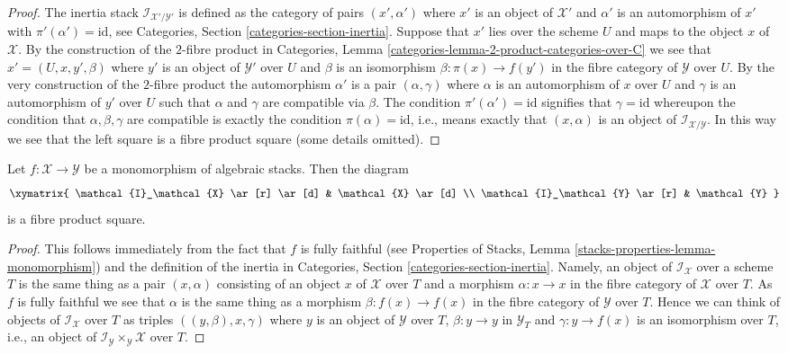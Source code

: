 \begin{proof}
The inertia stack $\mathcal{I}_{\mathcal{X}'/\mathcal{Y}'}$ is defined as the
category of pairs $(x', \alpha')$ where $x'$ is an object of $\mathcal{X}'$
and $\alpha'$ is an automorphism of $x'$ with $\pi'(\alpha') = \text{id}$, see
Categories, Section \ref{categories-section-inertia}.
Suppose that $x'$ lies over the scheme $U$ and maps to the object
$x$ of $\mathcal{X}$. By the construction of the $2$-fibre product in
Categories, Lemma \ref{categories-lemma-2-product-categories-over-C}
we see that $x' = (U, x, y', \beta)$ where $y'$ is an object of $\mathcal{Y}'$
over $U$ and $\beta$ is an isomorphism
$\beta : \pi(x) \to f(y')$ in the fibre category of $\mathcal{Y}$ over $U$.
By the very construction of the $2$-fibre product the automorphism $\alpha'$
is a pair $(\alpha, \gamma)$ where $\alpha$ is an automorphism of $x$ over $U$
and $\gamma$ is an automorphism of $y'$ over $U$ such that
$\alpha$ and $\gamma$ are compatible via $\beta$. The condition
$\pi'(\alpha') = \text{id}$ signifies that $\gamma = \text{id}$
whereupon the condition that $\alpha, \beta, \gamma$ are compatible
is exactly the condition $\pi(\alpha) = \text{id}$, i.e., means
exactly that $(x, \alpha)$ is an object of
$\mathcal{I}_{\mathcal{X}/\mathcal{Y}}$.
In this way we see that the left square is a fibre product square
(some details omitted).
\end{proof}

\begin{lemma}
\label{lemma-monomorphism-cartesian-square-inertia}
Let $f : \mathcal{X} \to \mathcal{Y}$ be a monomorphism of algebraic stacks.
Then the diagram
$$
\xymatrix{
\mathcal{I}_\mathcal{X} \ar[r] \ar[d] &
\mathcal{X} \ar[d] \\
\mathcal{I}_\mathcal{Y} \ar[r] &
\mathcal{Y}
}
$$
is a fibre product square.
\end{lemma}

\begin{proof}
This follows immediately from the fact that $f$ is fully faithful (see
Properties of Stacks, Lemma \ref{stacks-properties-lemma-monomorphism})
and the definition of the inertia in
Categories, Section \ref{categories-section-inertia}.
Namely, an object of $\mathcal{I}_\mathcal{X}$ over a scheme $T$ is
the same thing as a pair $(x, \alpha)$ consisting of an object
$x$ of $\mathcal{X}$ over $T$ and a morphism $\alpha : x \to x$ in
the fibre category of $\mathcal{X}$ over $T$. As $f$ is fully faithful
we see that $\alpha$ is the same thing as a morphism
$\beta : f(x) \to f(x)$ in the fibre category of $\mathcal{Y}$ over $T$.
Hence we can think of objects of $\mathcal{I}_\mathcal{X}$ over $T$
as triples $((y, \beta), x, \gamma)$ where $y$ is an object of
$\mathcal{Y}$ over $T$, $\beta : y \to y$ in $\mathcal{Y}_T$ and
$\gamma : y \to f(x)$ is an isomorphism over $T$, i.e., an object
of $\mathcal{I}_\mathcal{Y} \times_\mathcal{Y} \mathcal{X}$ over $T$.
\end{proof}

